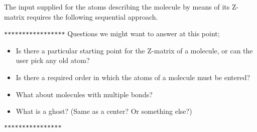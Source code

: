 % 
% 
%

The input supplied for the atoms describing the molecule by means of its
Z-matrix requires the following sequential approach.

\Large
\verb+*****************+
Questions we might want to answer at this point;
\begin{itemize}
\item Is there a particular starting point for the Z-matrix of a molecule,
or can the user pick any old atom?
\item Is there a required order in which the atoms of a molecule must be
entered?
\item What about molecules with multiple bonds?
\item What is a ghost?  (Same as a center?  Or something else?)
\end{itemize}
\verb+****************+
\normalsize

